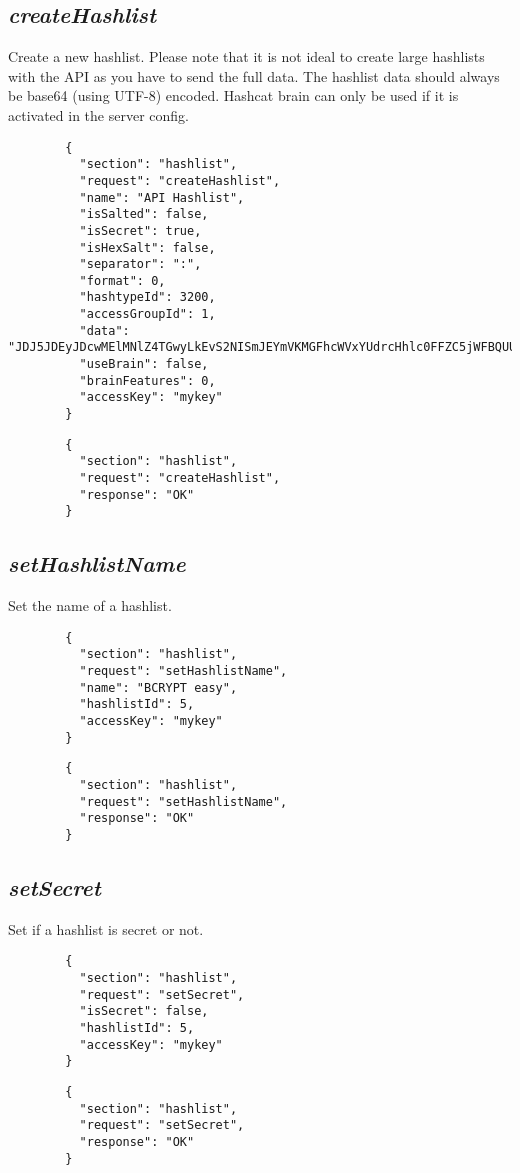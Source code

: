 \subsection*{\textit{createHashlist}}
	Create a new hashlist. Please note that it is not ideal to create large hashlists with the API as you have to send the full data. The hashlist data should always be base64 (using UTF-8) encoded. Hashcat brain can only be used if it is activated in the server config.
	{
		\color{blue}
		\begin{verbatim}
		{
		  "section": "hashlist",
		  "request": "createHashlist",
		  "name": "API Hashlist",
		  "isSalted": false,
		  "isSecret": true,
		  "isHexSalt": false,
		  "separator": ":",
		  "format": 0,
		  "hashtypeId": 3200,
		  "accessGroupId": 1,
		  "data": "JDJ5JDEyJDcwMElMNlZ4TGwyLkEvS2NISmJEYmVKMGFhcWVxYUdrcHhlc0FFZC5jWFBQUU4vWjNVN1c2",
		  "useBrain": false,
		  "brainFeatures": 0,
		  "accessKey": "mykey"
		}
		\end{verbatim}
	}
	{
		\color{OliveGreen}
		\begin{verbatim}
		{
		  "section": "hashlist",
		  "request": "createHashlist",
		  "response": "OK"
		}
		\end{verbatim}
	}
\subsection*{\textit{setHashlistName}}
	Set the name of a hashlist.
	{
		\color{blue}
		\begin{verbatim}
		{
		  "section": "hashlist",
		  "request": "setHashlistName",
		  "name": "BCRYPT easy",
		  "hashlistId": 5,
		  "accessKey": "mykey"
		}
		\end{verbatim}
	}
	{
		\color{OliveGreen}
		\begin{verbatim}
		{
		  "section": "hashlist",
		  "request": "setHashlistName",
		  "response": "OK"
		}
		\end{verbatim}
	}
\subsection*{\textit{setSecret}}
	Set if a hashlist is secret or not.
	{
		\color{blue}
		\begin{verbatim}
		{
		  "section": "hashlist",
		  "request": "setSecret",
		  "isSecret": false,
		  "hashlistId": 5,
		  "accessKey": "mykey"
		}
		\end{verbatim}
	}
	{
		\color{OliveGreen}
		\begin{verbatim}
		{
		  "section": "hashlist",
		  "request": "setSecret",
		  "response": "OK"
		}
		\end{verbatim}
	}
